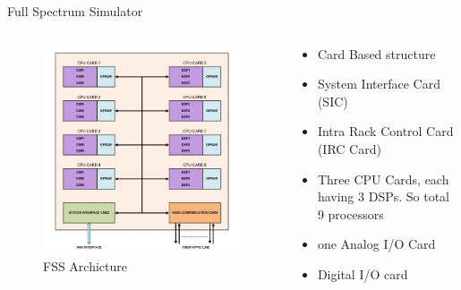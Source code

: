 \documentclass{beamer}
\begin{document}
\begin{frame}{Full Spectrum Simulator}
\begin{columns}
\begin{column}{0.5\textwidth}
\begin{figure}
\includegraphics[width=\columnwidth]{fig/FSS_arch.png}
\caption{FSS Archicture}
\end{figure}
\end{column}
\begin{column}{0.5\textwidth}
\begin{itemize}
\item Card Based structure
\item System Interface Card (SIC)
\item Intra Rack Control Card (IRC Card)
\item Three CPU Cards, each having 3 DSPs. So total 9 processors
\item one Analog I/O Card
\item Digital I/O card 
\end{itemize}
\end{column}
\end{columns}
\end{frame}   
\end{document}
